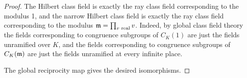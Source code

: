 \begin{proof}
%
The Hilbert class field is exactly the ray class field corresponding to the modulus 1, and the narrow Hilbert class field is exactly the ray class field corresponding to the modulus $\mathfrak{m}=\prod_{v\text{ real}}v$. Indeed, by global class field theory the fields corresponding to congruence subgroups of $C_K(1)$ are just the fields unramified over $K$, and the fields corresponding to congruence subgroups of $C_K(\mathfrak{m})$ are just the fields unramified at every infinite place.

The global reciprocity map gives the desired isomorphisms.
%
%
\end{proof}
